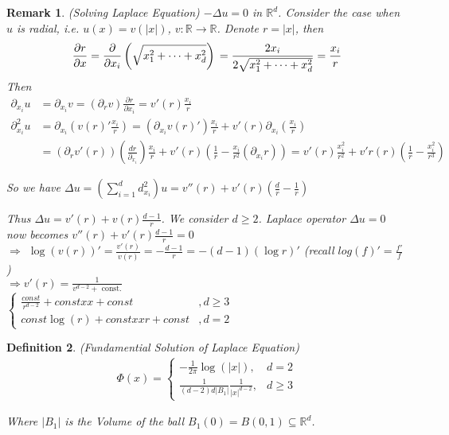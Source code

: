 \documentclass{report}
\theoremstyle{tommy}
\newtheorem{defn}{Definition}
\newtheorem{rem}[defn]{Remark}
\begin{document}
\begin{rem} (Solving Laplace Equation)
  \(-\Delta u = 0\) in \(\mathbb{R}^d\). Consider the case when \(u\) is radial, i.e. \(u(x) = v(|x|)\), \(v: \mathbb{R} \to \mathbb{R}\). Denote \(r = |x|\), then 
  \[
    \frac{\partial r}{\partial x} 
    = \frac{\partial}{\partial x_i}  \left(\sqrt{x_1^2 + \dots + x_d^2}\right) \\
    = \frac{2 x_i}{2{\sqrt{x_1^2 + \dots + x_d^2}}} \\
    = \frac{x_i}{r}
  \]
  Then
  \begin{align*}
    \partial_{x_i} u &= \partial_{x_i} v = (\partial_r v) \frac{\partial r}{\partial {x_i}} 
    = v'(r) \frac{x_i}{r} \\
    \partial^2_{x_i} u 
    &= \partial_{x_i} \left(v(r)' \frac{x_i}{r}\right) 
    = (\partial_{x_i}v(r)') \frac{x_i}{r} + v'(r) \partial_{x_i} \left(\frac{x_i}{r}\right) \\
    &= (\partial_r v'(r))\left(\frac{dr}{\partial_{x_i}}\right) \frac{x_i}{r} + v'(r)\left( \frac{1}{r} - \frac{x_i}{r^2}(\partial_{x_i} r) \right) 
    = v'(r) \frac{x_i^2}{r^2} + v'r(r)\left(\frac{1}{r} - \frac{x_i^2}{r^3}\right)
  \end{align*}

  So we have \(\Delta u = \left( \sum_{i=1}^d d_{x_i}^2 \right) u = v''(r) + v'(r) (\frac{d}{r} - \frac{1}{r})\)

  Thus \(\Delta u = v'(r) + v(r) \frac{d-1}{r}\). We consider \(d \ge 2\). Laplace operator \(\Delta u = 0\) now becomes \(v''(r) + v'(r) \frac{d-1}{r} = 0\) \\
  \(\Rightarrow\) \(\log(v(r))' = \frac{v'(r)}{v(r)} = - \frac{d-1}{r} = -(d-1)(\log r)'\) (recall \(log(f)' = \frac{f'}{f}\)) \\
  \(\Rightarrow v'(r) = \frac{1}{v^{d-2} + \text{ const.}}\) \\
  \(\begin{cases}
    \frac{const}{r^{d-2}} + const xx + const &,d \ge 3 \\
    const \log(r) + const xx r + const &,d = 2
  \end{cases}\)
\end{rem}

\begin{defn} 
  (Fundamential Solution of Laplace Equation)
  \begin{align*}
    \Phi(x) = \begin{cases}
      - \frac{1}{2 \pi} \log(|x|), & d = 2 \\
      \frac{1}{(d-2) d |B_1|} \frac{1}{|x|^{d-2}}, & d \ge 3
    \end{cases}
  \end{align*}
  
  Where \( |B_1| \) is the Volume of the ball \(B_1(0) = B(0, 1) \subseteq \mathbb{R}^d\).

\end{defn}
\end{document}
